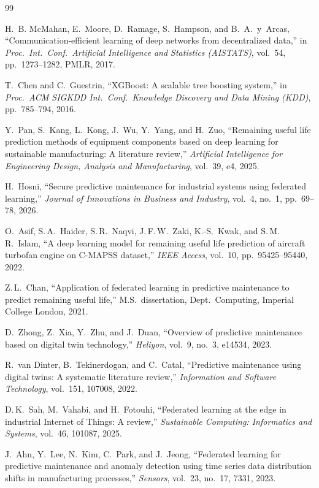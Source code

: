 \documentclass[10pt, journal, letterpaper]{IEEEtran}
\begin{document}
\begin{thebibliography}{99}

H.~B. McMahan, E.~Moore, D.~Ramage, S.~Hampson, and B.~A.\ y\ Arcas,
``Communication-efficient learning of deep networks from decentralized data,''
in \emph{Proc.\ Int.\ Conf.\ Artificial Intelligence and Statistics (AISTATS)},
vol.~54, pp.~1273--1282, PMLR, 2017.

T.~Chen and C.~Guestrin,
``XGBoost: A scalable tree boosting system,''
in \emph{Proc.\ ACM SIGKDD Int.\ Conf.\ Knowledge Discovery and Data Mining
(KDD)}, pp.~785--794, 2016.

Y.~Pan, S.~Kang, L.~Kong, J.~Wu, Y.~Yang, and H.~Zuo,
``Remaining useful life prediction methods of equipment components based on
deep learning for sustainable manufacturing: A literature review,''
\emph{Artificial Intelligence for Engineering Design, Analysis and
Manufacturing}, vol.~39, e4, 2025.

H.~Hosni,
``Secure predictive maintenance for industrial systems using federated
learning,'' \emph{Journal of Innovations in Business and Industry},
vol.~4, no.~1, pp.~69--78, 2026.

O.~Asif, S.\,A.~Haider, S.\,R.~Naqvi, J.\,F.\,W.~Zaki, K.-S.~Kwak,
and S.\,M.\,R.~Islam,
``A deep learning model for remaining useful life prediction of aircraft
turbofan engine on C-MAPSS dataset,''
\emph{IEEE Access}, vol.~10, pp.~95425--95440, 2022.

Z.\,L.~Chan,
``Application of federated learning in predictive maintenance to predict
remaining useful life,''
M.S.\ dissertation, Dept.\ Computing, Imperial College London, 2021.

D.~Zhong, Z.~Xia, Y.~Zhu, and J.~Duan,
``Overview of predictive maintenance based on digital twin technology,''
\emph{Heliyon}, vol.~9, no.~3, e14534, 2023.

R.~van Dinter, B.~Tekinerdogan, and C.~Catal,
``Predictive maintenance using digital twins: A systematic literature review,''
\emph{Information and Software Technology}, vol.~151, 107008, 2022.

D.\,K.~Sah, M.~Vahabi, and H.~Fotouhi,
``Federated learning at the edge in industrial Internet of Things: A review,''
\emph{Sustainable Computing: Informatics and Systems}, vol.~46, 101087, 2025.

J.~Ahn, Y.~Lee, N.~Kim, C.~Park, and J.~Jeong,
``Federated learning for predictive maintenance and anomaly detection using
time series data distribution shifts in manufacturing processes,''
\emph{Sensors}, vol.~23, no.~17, 7331, 2023.


\end{thebibliography}
\end{document}
